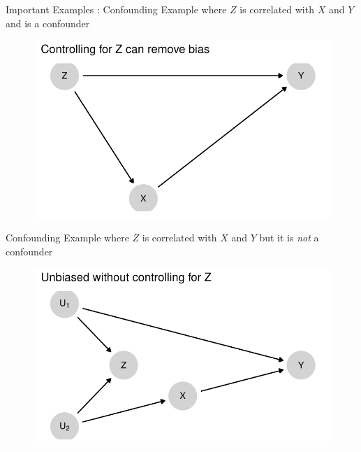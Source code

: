 \documentclass[
  11pt,
  ignorenonframetext,
]{beamer}
\begin{document}
\begin{frame}{Important Examples : Confounding}
\protect\hypertarget{important-examples-confounding}{}
Example where \(Z\) is correlated with \(X\) and \(Y\) and is a
confounder

\begin{figure}

{\centering \includegraphics{2.2_estimands_files/figure-beamer/unnamed-chunk-11-1.pdf}

}

\end{figure}
\end{frame}

\begin{frame}{Confounding}
\protect\hypertarget{confounding}{}
Example where \(Z\) is correlated with \(X\) and \(Y\) but it is
\emph{not} a confounder

\begin{figure}

{\centering \includegraphics{2.2_estimands_files/figure-beamer/unnamed-chunk-12-1.pdf}

}

\end{figure}
\end{frame}
\end{document}
